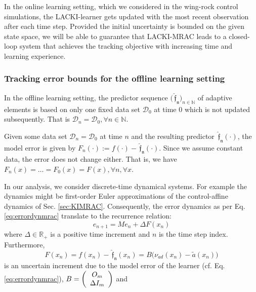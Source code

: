\documentclass{article} %
\theoremstyle{definition}
\theoremstyle{remark}
\newcommand{\Real}{\mathbb R}
\newcommand{\nat}{\mathbb N}
\newcommand{\data}{\ensuremath{ \mathcal D} }
\newcommand{\predfn}{\, \mathfrak{  \hat f_n}} %
\newcommand{\seq}[2]{\ensuremath{\bigl(#1\bigr)_{#2}}}
\newcommand{\tinc}{\ensuremath{ \Delta}}
\begin{document}
In the online learning setting, which we considered in the wing-rock control simulations, the LACKI-learner gets updated with the most recent observation after each time step. Provided the initial uncertainty is bounded on the given state space, we will be able to guarantee that LACKI-MRAC leads to a closed-loop system that achieves the tracking objective with increasing time and learning experience. 

\subsubsection{Tracking error bounds for the offline learning setting} 
In the offline learning setting, the predictor sequence $\seq{\predfn}{n \in \nat}$ of adaptive elements is based on only one fixed data set $\data_0$ at time $0$ which is not updated subsequently.
That is $\data_n = \data_0, \forall n \in \nat$.

Given some data set $\data_n =\data_0$ at time $n$ and the resulting predictor $\predfn(\cdot)$, the model error is given by $F_n(\cdot) := f(\cdot) - \predfn(\cdot)$. Since we assume constant data, the error does not change either. That is, we have $F_n(x) = \ldots = F_0(x) = F(x), \forall n,\forall x$.
 
In our analysis, we consider discrete-time dynamical systems. For example the dynamics might be first-order Euler approximations of the control-affine dynamics of Sec. \ref{sec:KIMRAC}.
Consequently, the error dynamics as per Eq. \ref{eq:errordynmrac} translate to the recurrence relation:
\begin{equation}\label{eq:errordynmrac_nIMRACdiscrete}
	e_{n+1}  = M e_n + \tinc F(x_n)
\end{equation}
where $\tinc \in \Real_+$ is a positive time increment and  $n$ is the time step index. Furthermore,
%
\begin{equation}
	F(x_n) = f(x_n) - \predfn(x_n) = B \bigl(\nu_{ad}(x_n) -  \tilde a(x_n)\bigr) 
\end{equation}
is an uncertain increment due to the model error of the learner (cf. Eq. \ref{eq:errordynmrac}), 						$B = \left(\begin{array}[h]{c}
				O_m \\ \tinc I_m
						\end{array}\right)$ and 
\end{document}
